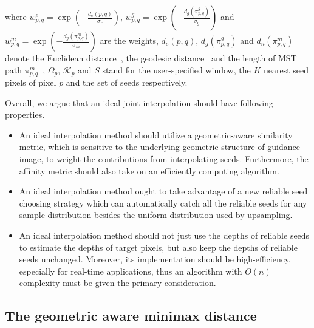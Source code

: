 \documentclass[preprint,10pt,5p,times,twocolumn]{elsarticle}
\begin{document}
%
where $w^e_{p,q} = \exp( - \frac{{d_e}(p,q)}{\sigma_e})$, $w^g_{p,q} = \exp( - \frac{{d_g}(\pi _{{p},{q}}^g)}{\sigma_g} )$ and $w^m_{p,q} = \exp(- \frac{{d_g}(\pi _{{p},{q}}^m)}{\sigma_m})$ are the weights, $d_e(p,q)$, ${d_g}(\pi _{{p},{q}}^g)$ and ${d_n}(\pi _{{p},{q}}^m)$ denote the Euclidean distance~\cite{Kopf2007}, the geodesic distance~\cite{Liu2013} and the length of MST path $\pi _{{p},{q}}^m$~\cite{Yang2012}, $\Omega_p$, $\mathcal{K}_p$ and $S$  stand for the user-specified window, the $K$ nearest seed pixels of pixel $p$ and the set of seeds respectively.





Overall, we argue that an ideal joint interpolation should have following properties.

\begin{itemize}

  \item An ideal interpolation method should utilize a geometric-aware similarity metric, which is sensitive to the underlying geometric structure of guidance image, to weight the contributions from interpolating seeds. Furthermore, the affinity metric should also take on an efficiently computing algorithm.

  \item An ideal interpolation method ought to take advantage of a new reliable seed choosing strategy which can automatically catch all the reliable seeds for any sample distribution besides the uniform distribution used by upsampling.

  \item An ideal interpolation method should not just use the depths of reliable seeds to estimate the depths of target pixels, but also keep the depths of reliable seeds unchanged. Moreover, its implementation should be high-efficiency, especially for real-time applications, thus an algorithm with $O(n)$ complexity must be given the primary consideration.

\end{itemize}




\subsection{The geometric aware minimax distance}
%
\end{document}
